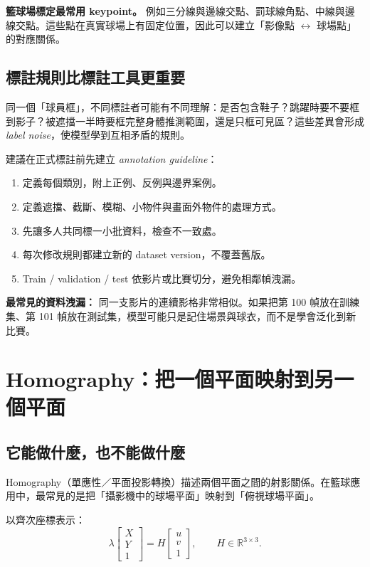\documentclass[11pt,a4paper,oneside]{report}
\newcommand{\eng}[1]{\textit{#1}}
\begin{document}
\begin{plainBox}
\textbf{籃球場標定最常用 keypoint。}\quad
例如三分線與邊線交點、罰球線角點、中線與邊線交點。這些點在真實球場上有固定位置，因此可以建立「影像點 $\leftrightarrow$ 球場點」的對應關係。
\end{plainBox}

\subsection{標註規則比標註工具更重要}

同一個「球員框」，不同標註者可能有不同理解：是否包含鞋子？跳躍時要不要框到影子？被遮擋一半時要框完整身體推測範圍，還是只框可見區？這些差異會形成 \eng{label noise}，使模型學到互相矛盾的規則。

建議在正式標註前先建立 \eng{annotation guideline}：

\begin{enumerate}
  \item 定義每個類別，附上正例、反例與邊界案例。
  \item 定義遮擋、截斷、模糊、小物件與畫面外物件的處理方式。
  \item 先讓多人共同標一小批資料，檢查不一致處。
  \item 每次修改規則都建立新的 dataset version，不覆蓋舊版。
  \item Train / validation / test 依影片或比賽切分，避免相鄰幀洩漏。
\end{enumerate}

\begin{riskBox}
\textbf{最常見的資料洩漏：}\quad
同一支影片的連續影格非常相似。如果把第 100 幀放在訓練集、第 101 幀放在測試集，模型可能只是記住場景與球衣，而不是學會泛化到新比賽。
\end{riskBox}

\section{Homography：把一個平面映射到另一個平面}

\subsection{它能做什麼，也不能做什麼}

Homography（單應性／平面投影轉換）描述兩個平面之間的射影關係。在籃球應用中，最常見的是把「攝影機中的球場平面」映射到「俯視球場平面」。

以齊次座標表示：
\[
\lambda
\begin{bmatrix}X\\Y\\1\end{bmatrix}
=
H
\begin{bmatrix}u\\v\\1\end{bmatrix},
\qquad
H\in\mathbb{R}^{3\times 3}.
\]
\end{document}
